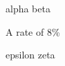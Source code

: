\begin{outer}%
  alpha beta %
  \begin{inner}%
    A rate of 8\% %
  \end{inner}%

  epsilon zeta
\end{outer}%
